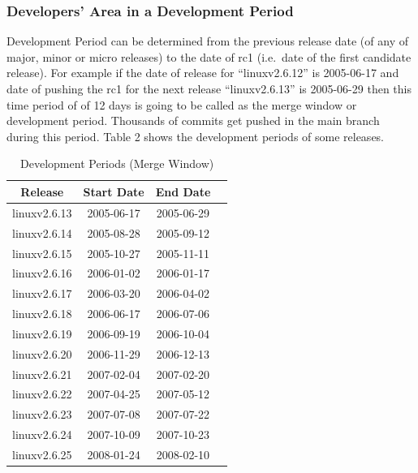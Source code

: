\documentclass{acm_proc_article-sp}
\begin{document}
\subsubsection{Developers' Area in a Development Period}
Development Period can be determined from the previous release date (of any of major, minor or micro releases) to the date of rc1 (i.e.\ date of the first candidate release). For example if the date of release for ``linuxv2.6.12'' is 2005-06-17 and date of pushing the rc1 for the next release ``linuxv2.6.13'' is 2005-06-29 then this time period of of 12 days is going to be called as the merge window or development period. Thousands of commits get pushed in the main branch during this period. Table 2 shows the development periods of some releases.

\begin{table}[ht]
\caption{Development Periods (Merge Window)}  %
\centering 						%
\begin{tabular}{c c c c}				%
\hline\hline						%
Release 			& Start Date		& End Date \\ [0.5ex]
\hline 							%
linuxv2.6.13		& 2005-06-17	& 2005-06-29 \\
linuxv2.6.14		& 2005-08-28	& 2005-09-12 \\
linuxv2.6.15		& 2005-10-27	& 2005-11-11 \\
linuxv2.6.16		& 2006-01-02	& 2006-01-17 \\
linuxv2.6.17		& 2006-03-20	& 2006-04-02 \\
linuxv2.6.18		& 2006-06-17	& 2006-07-06 \\
linuxv2.6.19		& 2006-09-19	& 2006-10-04 \\
linuxv2.6.20  		& 2006-11-29	& 2006-12-13 \\
linuxv2.6.21		& 2007-02-04	& 2007-02-20 \\
linuxv2.6.22		& 2007-04-25	& 2007-05-12 \\
linuxv2.6.23		& 2007-07-08	& 2007-07-22 \\
linuxv2.6.24		& 2007-10-09	& 2007-10-23 \\
linuxv2.6.25		& 2008-01-24	& 2008-02-10 \\
[1ex]							%
\hline 							%
\end{tabular}
\label{table:nonlin} 			%
\end{table}
\end{document}
